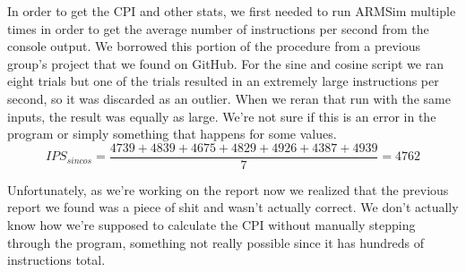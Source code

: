 \documentclass[11pt]{article}
\begin{document}
In order to get the CPI and other stats, we first needed to run ARMSim multiple times in order to get
the average number of instructions per second from the console output. We borrowed this portion of the
procedure from a previous group's project that we found on GitHub.\cite{oldreport} For the sine and
cosine script we ran eight trials but one of the trials resulted in an extremely large instructions
per second, so it was discarded as an outlier. When we reran that run with the same inputs, the result
was equally as large. We're not sure if this is an error in the program or simply something that happens
for some values.\\

\begin{equation}
    IPS_{sincos} = \frac{4739 + 4839 + 4675 + 4829 + 4926 + 4387 + 4939}{7} = 4762
\end{equation}

Unfortunately, as we're working on the report now we realized that the previous report we found was a
piece of shit and wasn't actually correct.\cite{oldreport} We don't actually know how we're supposed to
calculate the CPI without manually stepping through the program, something not really possible since it
has hundreds of instructions total.



\printbibliography
\end{document}
